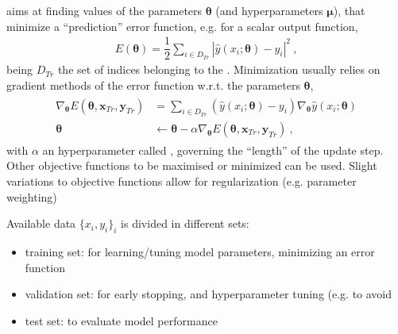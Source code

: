 \documentclass[letterpaper,10pt,english]{jupyterBook}
\begin{document}
\sphinxAtStartPar
{} aims at finding values of the parameters \(\boldsymbol{\theta}\) (and hyper\sphinxhyphen{}parameters \(\boldsymbol{\mu}\)), that minimize a “prediction” error function, e.g. for a scalar output function,
\begin{equation*}
\begin{split}E(\boldsymbol{\theta}) = \dfrac{1}{2} \sum_{i \in D_{Tr}} | \hat{y}(x_i; \boldsymbol{\theta}) - y_i |^2 \ ,\end{split}
\end{equation*}
\sphinxAtStartPar
being \(D_{Tr}\) the set of indices belonging to the . Minimization usually relies on gradient methods of the error function w.r.t. the parameters \(\boldsymbol{\theta}\),
\begin{equation*}
\begin{split}\begin{aligned}
  \nabla_{\boldsymbol{\theta}} E(\boldsymbol{\theta}, \mathbf{x}_{Tr}, \mathbf{y}_{Tr}) & = \sum_{i \in D_{Tr}} \left( \hat{y}(x_i; \boldsymbol{\theta}) - y_i \right) \nabla_{\boldsymbol{\theta}} \hat{y}(x_i; \boldsymbol{\theta}) \\
  \boldsymbol{\theta} & \leftarrow \boldsymbol{\theta} - \alpha \nabla_{\boldsymbol{\theta}} E(\boldsymbol{\theta}, \mathbf{x}_{Tr}, \mathbf{y}_{Tr}) \ ,
\end{aligned}\end{split}
\end{equation*}
\sphinxAtStartPar
with \(\alpha\) an hyper\sphinxhyphen{}parameter called , governing the “length” of the update step.
Other objective functions to be maximised or minimized can be used. Slight variations to objective functions allow for regularization (e.g. parameter weighting)

\sphinxAtStartPar
{} Available data \(\{ x_i, y_i \}_i\) is divided in different sets:
\begin{itemize}
\item {} 
\sphinxAtStartPar
training set: for learning/tuning model parameters, minimizing an error function

\item {} 
\sphinxAtStartPar
validation set: for early stopping, and hyper\sphinxhyphen{}parameter tuning (e.g. to avoid

\item {} 
\sphinxAtStartPar
test set: to evaluate model performance

\end{itemize}
\end{document}
